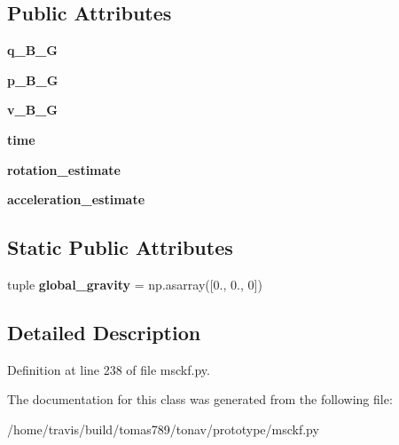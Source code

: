 \subsection*{Public Attributes}
\begin{DoxyCompactItemize}
\item 
\hypertarget{classmsckf_1_1_body_state_ae66c70ddae91a648f29efc568f4344da}{{\bfseries q\-\_\-\-B\-\_\-\-G}}\label{classmsckf_1_1_body_state_ae66c70ddae91a648f29efc568f4344da}

\item 
\hypertarget{classmsckf_1_1_body_state_a0f413de95b39715210b1d88e3d6e707b}{{\bfseries p\-\_\-\-B\-\_\-\-G}}\label{classmsckf_1_1_body_state_a0f413de95b39715210b1d88e3d6e707b}

\item 
\hypertarget{classmsckf_1_1_body_state_aaea8bab90d430f203ff8d8fabd9a16d7}{{\bfseries v\-\_\-\-B\-\_\-\-G}}\label{classmsckf_1_1_body_state_aaea8bab90d430f203ff8d8fabd9a16d7}

\item 
\hypertarget{classmsckf_1_1_body_state_a663d35092ee45633a18a9eab916c7c2a}{{\bfseries time}}\label{classmsckf_1_1_body_state_a663d35092ee45633a18a9eab916c7c2a}

\item 
\hypertarget{classmsckf_1_1_body_state_ac4940afd5c65881731a6a03e090c5093}{{\bfseries rotation\-\_\-estimate}}\label{classmsckf_1_1_body_state_ac4940afd5c65881731a6a03e090c5093}

\item 
\hypertarget{classmsckf_1_1_body_state_a658e340e374f712b049f3197530d3365}{{\bfseries acceleration\-\_\-estimate}}\label{classmsckf_1_1_body_state_a658e340e374f712b049f3197530d3365}

\end{DoxyCompactItemize}
\subsection*{Static Public Attributes}
\begin{DoxyCompactItemize}
\item 
\hypertarget{classmsckf_1_1_body_state_a6ce3e615316fa82782296558cd96e3fb}{tuple {\bfseries global\-\_\-gravity} = np.\-asarray(\mbox{[}0., 0., 0\mbox{]})}\label{classmsckf_1_1_body_state_a6ce3e615316fa82782296558cd96e3fb}

\end{DoxyCompactItemize}


\subsection{Detailed Description}


Definition at line 238 of file msckf.\-py.



The documentation for this class was generated from the following file\-:\begin{DoxyCompactItemize}
\item 
/home/travis/build/tomas789/tonav/prototype/msckf.\-py\end{DoxyCompactItemize}
